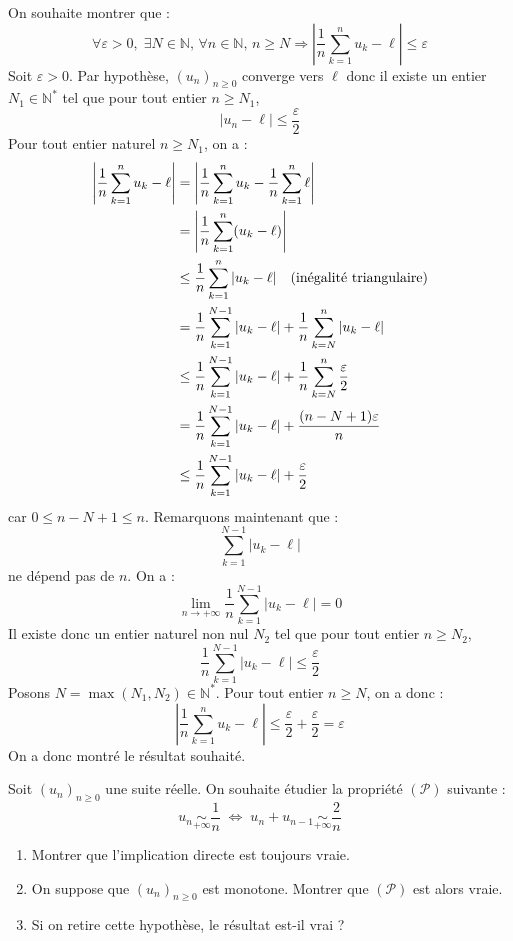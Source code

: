 \documentclass[a4paper,10pt]{report}
\begin{document}
\corr On souhaite montrer que :
$$ \forall \varepsilon>0, \; \exists N \in \mathbb{N}, \, \forall n \in \mathbb{N}, \, n \geq N \Longrightarrow \left\vert \frac{1}{n} \sum_{k=1}^n u_k - \ell \right\vert \leq \varepsilon$$
Soit $\varepsilon>0$. Par hypothèse, $(u_n)_{n \geq 0}$ converge vers $\ell$ donc il existe un entier $N_1 \in \mathbb{N}^*$ tel que pour tout entier $n \geq N_1$,
$$ \vert u_n - \ell \vert \leq \dfrac{\varepsilon}{2}$$
Pour tout entier naturel $n \geq N_1$, on a :
\begin{align*}
\left\vert \frac{1}{n} \sum_{k=1}^n u_k - \ell \right\vert & = \left\vert \frac{1}{n} \sum_{k=1}^n u_k - \frac{1}{n} \sum_{k=1}^n \ell \right\vert \\
& = \left\vert \frac{1}{n} \sum_{k=1}^n (u_k - \ell) \right\vert \\
& \leq \dfrac{1}{n} \sum_{k=1}^n \vert u_k - \ell \vert  \quad \hbox{(inégalité triangulaire)} \\
& = \dfrac{1}{n} \sum_{k=1}^{N-1} \vert u_k - \ell \vert + \dfrac{1}{n} \sum_{k=N}^n \vert u_k - \ell \vert \\
& \leq \dfrac{1}{n} \sum_{k=1}^{N-1} \vert u_k - \ell \vert + \dfrac{1}{n} \sum_{k=N}^n \dfrac{\varepsilon}{2} \\
& = \dfrac{1}{n} \sum_{k=1}^{N-1} \vert u_k - \ell \vert + \dfrac{(n-N+1) \varepsilon}{n}  \\
& \leq  \dfrac{1}{n} \sum_{k=1}^{N-1} \vert u_k - \ell \vert +\dfrac{\varepsilon}{2} \\
\end{align*}
car $0 \leq n-N+1 \leq n$. Remarquons maintenant que :
$$\sum_{k=1}^{N-1} \vert u_k - \ell \vert$$
ne dépend pas de $n$. On a :
$$ \lim_{n \rightarrow + \infty} \dfrac{1}{n} \sum_{k=1}^{N-1} \vert u_k - \ell \vert = 0$$
Il existe donc un entier naturel non nul $N_2$ tel que pour tout entier $n \geq N_2$,
$$ \dfrac{1}{n} \sum_{k=1}^{N-1} \vert u_k - \ell \vert \leq \dfrac{\varepsilon}{2}$$
Posons $N= \max(N_1, N_2) \in \mathbb{N}^*$. Pour tout entier $n \geq N$, on a donc :
$$ \left\vert \frac{1}{n} \sum_{k=1}^n u_k - \ell \right\vert \leq \dfrac{\varepsilon}{2} +  \dfrac{\varepsilon}{2} = \varepsilon$$
On a donc montré le résultat souhaité. 

\medskip

\begin{Exercice}{} Soit $(u_n)_{n \geq 0}$ une suite réelle. On souhaite étudier la propriété $(\mathcal{P})$ suivante :
$$ u_n \underset{+ \infty}{\sim} \dfrac{1}{n} \; \Longleftrightarrow \; u_n + u_{n-1} \underset{+ \infty}{\sim} \dfrac{2}{n}$$
\begin{enumerate}
\item Montrer que l'implication directe est toujours vraie.
\item On suppose que $(u_n)_{n \geq 0}$ est monotone. Montrer que $(\mathcal{P})$ est alors vraie.
\item Si on retire cette hypothèse, le résultat est-il vrai ?
\end{enumerate}
\end{Exercice}
\end{document}
